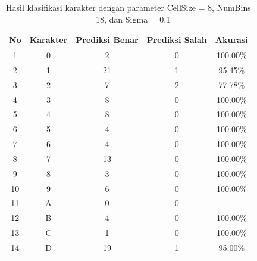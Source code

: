 \begin{longtable}[c]{|c|c|c|c|c|}
	\caption{Hasil klasifikasi karakter dengan parameter CellSize = 8, NumBins = 18, dan Sigma = 0.1}
	\label{tab:hasilklasifikasisel8}\\
	\hline
	\textbf{No} & \textbf{Karakter} & \textbf{Prediksi Benar} & \textbf{Prediksi Salah} & \textbf{Akurasi} \\ \hline
	\endhead
	1           & 0                 & 2                       & 0                       &100.00\%            \\ \hline
	2           & 1                 & 21                       & 1                       &95.45\%            \\ \hline
	3           & 2                 & 7                       & 2                       &77.78\%            \\ \hline
	4           & 3                 & 8                       & 0                       &100.00\%            \\ \hline
	5           & 4                 & 8                       & 0                       &100.00\%            \\ \hline
	6           & 5                 & 4                       & 0                       &100.00\%            \\ \hline
	7           & 6                 & 4                       & 0                       &100.00\%            \\ \hline
	8           & 7                 & 13                       & 0                       &100.00\%            \\ \hline
	9           & 8                 & 3                       & 0                       &100.00\%            \\ \hline
	10           & 9                 & 6                       & 0                       &100.00\%            \\ \hline
	11           & A                 & 0                       & 0                       & -            \\ \hline
	12           & B                 & 4                       & 0                       &100.00\%            \\ \hline
	13           & C                 & 1                       & 0                       &100.00\%            \\ \hline
	14           & D                 & 19                       & 1                       &95.00\%            \\ \hline

\end{longtable}
